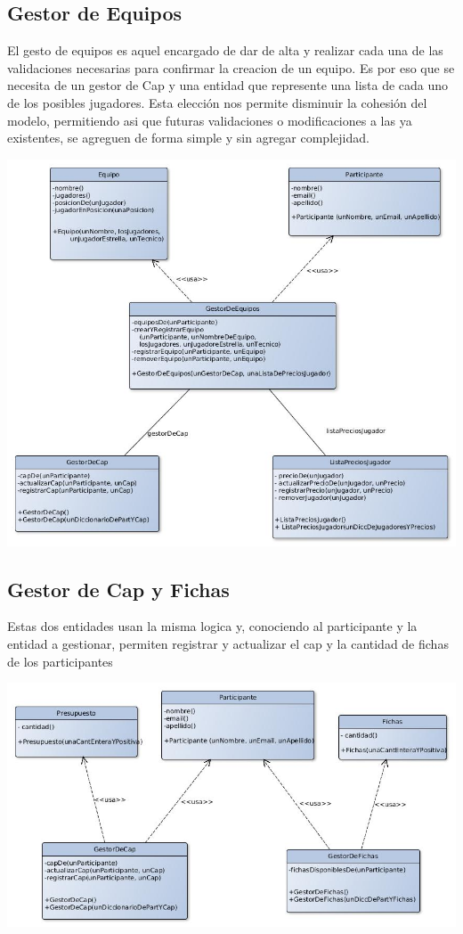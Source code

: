 \subsection{Gestor de Equipos}
El gesto de equipos es aquel encargado de dar de alta y realizar cada una de las validaciones necesarias para confirmar la creacion de un equipo. Es por eso que se necesita de un gestor de Cap y una entidad que represente una lista de cada uno de los posibles jugadores. Esta elección nos permite disminuir la cohesión del modelo, permitiendo asi que futuras validaciones o modificaciones a las ya existentes, se agreguen de forma simple y sin agregar complejidad.
\begin{center}
\includegraphics[scale=0.4]{diseno/gestorDeEquipos.jpg}
\end{center}

\subsection{Gestor de Cap y Fichas}
Estas dos entidades usan la misma logica y, conociendo al participante y la entidad a gestionar, permiten registrar y actualizar el cap y la cantidad de fichas de los participantes
\begin{center}
\includegraphics[scale=0.4]{diseno/gestorDeCapYFichas.jpg} 
\end{center}

